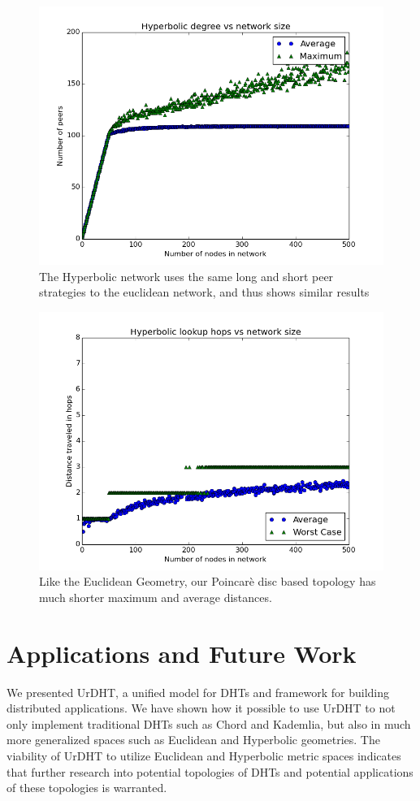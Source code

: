 \documentclass[11pt,conference]{IEEEtran}
\begin{document}
\begin{figure}
\centering
\includegraphics[width=0.7\linewidth]{figs/HyperbolicDegree}
\caption{The Hyperbolic network uses the same long and short peer strategies to the euclidean network, and thus shows similar results}
\label{fig:HyperbolicDegree}
\end{figure}
\begin{figure}
\centering
\includegraphics[width=0.7\linewidth]{figs/HyperbolicDistance}
\caption{Like the Euclidean Geometry, our Poincar\`{e} disc based topology has much shorter maximum and average distances.
}
\label{fig:HyperbolicDistance}
\end{figure}





\section{Applications and Future Work}
\label{sec:future}

We presented UrDHT, a unified model for DHTs and framework for building distributed applications.
We have shown how it possible to use UrDHT to not only implement traditional DHTs such as Chord and Kademlia, but also in much more generalized spaces such as Euclidean and Hyperbolic geometries.
The viability of UrDHT to utilize Euclidean and Hyperbolic metric spaces indicates that further research into potential topologies of DHTs and potential applications of these topologies is warranted.
\end{document}
